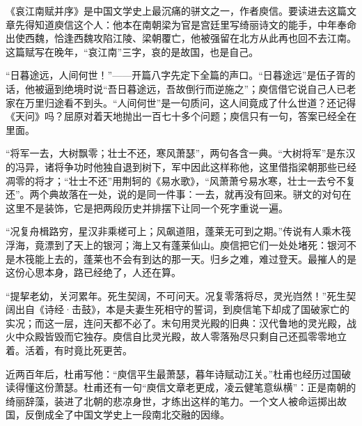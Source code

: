 \begin{appreciation}
《哀江南赋并序》是中国文学史上最沉痛的骈文之一，作者庾信。要读进去这篇文章先得知道庾信这个人：他本在南朝梁为官是宫廷里写绮丽诗文的能手，中年奉命出使西魏，恰逢西魏攻陷江陵、梁朝覆亡，他被强留在北方从此再也回不去江南。这篇赋写在晚年，“哀江南”三字，哀的是故国，也是自己。

“日暮途远，人间何世！”——开篇八字先定下全篇的声口。“日暮途远”是伍子胥的话，他被逼到绝境时说“吾日暮途远，吾故倒行而逆施之”；庾信借它说自己人已老家在万里归途看不到头。“人间何世”是一句质问，这人间竟成了什么世道？还记得《天问》吗？屈原对着天地抛出一百七十多个问题；庾信只有一句，答案已经全在里面。

“将军一去，大树飘零；壮士不还，寒风萧瑟”，两句各含一典。“大树将军”是东汉的冯异，诸将争功时他独自退到树下，军中因此这样称他，这里借指梁朝那些已经凋零的将才；“壮士不还”用荆轲的《易水歌》，“风萧萧兮易水寒，壮士一去兮不复还”。两个典故落在一处，说的是同一件事：一去，就再没有回来。骈文的对句在这里不是装饰，它是把两段历史并排摆下让同一个死字重说一遍。

“况复舟楫路穷，星汉非乘槎可上；风飙道阻，蓬莱无可到之期。”传说有人乘木筏浮海，竟漂到了天上的银河；海上又有蓬莱仙山。庾信把它们一处处堵死：银河不是木筏能上去的，蓬莱也不会有到达的那一天。归乡之难，难过登天。最摧人的是这份心思本身，路已经绝了，人还在算。

“提挈老幼，关河累年。死生契阔，不可问天。况复零落将尽，灵光岿然！”死生契阔出自《诗经·击鼓》，本是夫妻生死相守的誓词，到庾信笔下却成了国破家亡的实况；而这一层，连问天都不必了。末句用灵光殿的旧典：汉代鲁地的灵光殿，战火中众殿皆毁而它独存。庾信自比灵光殿，故人零落殆尽只剩自己还孤零零地立着。活着，有时竟比死更苦。

近两百年后，杜甫写他：“庾信平生最萧瑟，暮年诗赋动江关。”杜甫也经历过国破读得懂这份萧瑟。杜甫还有一句“庾信文章老更成，凌云健笔意纵横”：正是南朝的绮丽辞藻，装进了北朝的悲凉身世，才练出这样的笔力。一个文人被命运掷出故国，反倒成全了中国文学史上一段南北交融的因缘。
\end{appreciation}
